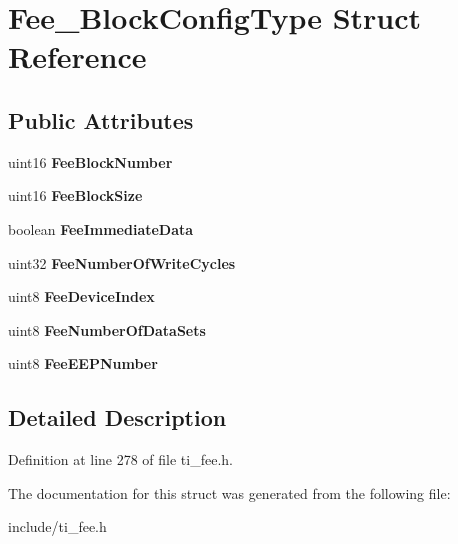\hypertarget{structFee__BlockConfigType}{}\section{Fee\+\_\+\+Block\+Config\+Type Struct Reference}
\label{structFee__BlockConfigType}
\subsection*{Public Attributes}
\begin{DoxyCompactItemize}
\item 
\mbox{\label{structFee__BlockConfigType_a75a0f473c049cdc9d35f9430f0e9519b}} 
uint16 {\bfseries Fee\+Block\+Number}
\item 
\mbox{\label{structFee__BlockConfigType_a165228947b39dcc267f563a204e0f9cc}} 
uint16 {\bfseries Fee\+Block\+Size}
\item 
\mbox{\label{structFee__BlockConfigType_a3f2168023f6a6d01392f39bdcd629339}} 
boolean {\bfseries Fee\+Immediate\+Data}
\item 
\mbox{\label{structFee__BlockConfigType_a01f7120413d57908344e6250f7d1673d}} 
uint32 {\bfseries Fee\+Number\+Of\+Write\+Cycles}
\item 
\mbox{\label{structFee__BlockConfigType_a9abf2294f92879f68147bd9d7c24da0a}} 
uint8 {\bfseries Fee\+Device\+Index}
\item 
\mbox{\label{structFee__BlockConfigType_a962fcef38c40d323a822320fb3bf56ba}} 
uint8 {\bfseries Fee\+Number\+Of\+Data\+Sets}
\item 
\mbox{\label{structFee__BlockConfigType_a10f717db7231f833eef9f8725f59e694}} 
uint8 {\bfseries Fee\+E\+E\+P\+Number}
\end{DoxyCompactItemize}


\subsection{Detailed Description}


Definition at line 278 of file ti\+\_\+fee.\+h.



The documentation for this struct was generated from the following file\+:\begin{DoxyCompactItemize}
\item 
include/ti\+\_\+fee.\+h\end{DoxyCompactItemize}
